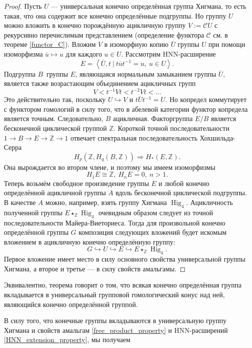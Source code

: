\documentclass[14pt, dvipsnames, twoside]{extarticle}
\theoremstyle{definition}
\theoremstyle{remark}
\DeclareMathOperator{\Hig}{\mathrm{Hig}}
\begin{document}
\begin{proof}

Пусть $U$ --- универсальная конечно определённая группа Хигмана, то есть такая, что она содержит все конечно определённые подгруппы. Но группу $U$ можно вложить в конечно порождённую ацикличную группу $V := \mathcal{C}U$ с рекурсивно перечислимым представлением (определение функтора $\mathcal{C}$ см. в теореме \ref{functor_C}). Вложим $V$ в изоморфную копию $\overline{U}$ группы $U$ при помощи изоморфизма $\overline{u}\mapsto u$ для каждого $u\in U$. Рассмотрим HNN-расширение $$E=\left \langle \overline{U}, t\ | \ t\overline{u}t^{-1} = u, \ u\in U  \right \rangle.$$ Подгруппа $B$ группы $E$, являющаяся нормальным замыканием группы $\overline{U}$, является также возрастающим объединением ацикличных групп $$V < t^{-1} V t < t^{-2} V t < ...$$ Это действительно так, поскольку $U\hookrightarrow V$ и $t\overline{U}t^{-1} = U$. Но копредел коммутирует с функтором гомологий в силу того, что в абелевой категории функтор копредела является точным. Следовательно, $B$ ацикличная. Факторгруппа $E/B$ является бесконечной циклической группой $\mathbb{Z}$. Короткой точной последовательности $1\to B\to E\to \mathbb{Z}\to 1$ отвечает спектральная последовательность Хохшильда-Серра $$H_p(\mathbb{Z}, H_q(B, \mathbb{Z}))\Rightarrow H_\ast(E, \mathbb{Z}).$$ Она вырождается во втором члене, и поэтому мы имеем изоморфизмы $$H_1E\cong\mathbb{Z},\ H_nE = 0, \ n > 1.$$ Теперь возьмём свободное произведение группы $E$ и любой конечно определённой ацикличной группы $A$ вдоль бесконечной циклической подгруппы. В качестве $A$ можно, например, взять группу Хигмана $\Hig_4$. Ацикличность полученной группы $E\star_{\mathbb{Z}}\Hig_4$ очевидным образом следует из точной последовательности Майера-Виеториеса. Тогда для произвольной конечно определённой группы $G$ композиция следующих вложений будет искомым вложением в ацикличную конечно определённую группу: $$G\hookrightarrow U\hookrightarrow E\hookrightarrow E\star_{\mathbb{Z}}\Hig_4.$$ Первое вложение имеет место в силу основного свойства универсальной группы Хигмана, а второе и третье --- в силу свойств амальгамы.      

\end{proof}



Эквивалентно, теорема говорит о том, что всякая конечно определённая группа вкладывается в универсальный групповой гомологический конус над ней, являющийся конечно определённой группой. 

В силу того, что конечные группы вкладываются в универсальную группу Хигмана и свойств амальгам \ref{free_product_property} и HNN-расширений \ref{HNN_extension_property}, мы получаем 
\end{document}
